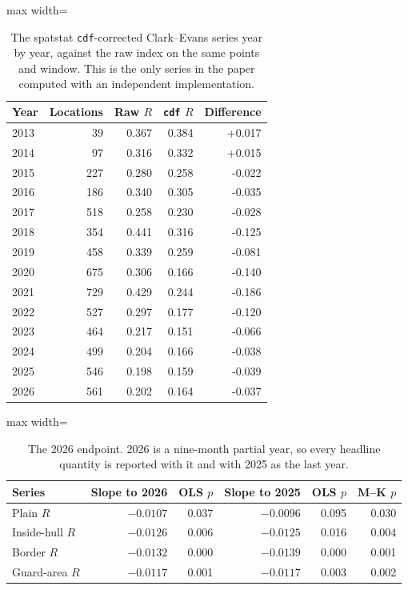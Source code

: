 \documentclass[fleqn,10pt]{wlpeerj}
\begin{document}
\begin{table}[H]
\centering
\caption{The \textsf{spatstat} \texttt{cdf}-corrected Clark--Evans series year by year, against
the raw index on the same points and window. This is the only series in the paper computed with
an independent implementation.}
\label{si:cdfseries}
\small
\begin{adjustbox}{max width=\linewidth}
\begin{tabular}{lrrrr}
\toprule
Year & Locations & Raw $R$ & \texttt{cdf} $R$ & Difference \\
\midrule
2013 & 39 & 0.367 & 0.384 & +0.017 \\
2014 & 97 & 0.316 & 0.332 & +0.015 \\
2015 & 227 & 0.280 & 0.258 & -0.022 \\
2016 & 186 & 0.340 & 0.305 & -0.035 \\
2017 & 518 & 0.258 & 0.230 & -0.028 \\
2018 & 354 & 0.441 & 0.316 & -0.125 \\
2019 & 458 & 0.339 & 0.259 & -0.081 \\
2020 & 675 & 0.306 & 0.166 & -0.140 \\
2021 & 729 & 0.429 & 0.244 & -0.186 \\
2022 & 527 & 0.297 & 0.177 & -0.120 \\
2023 & 464 & 0.217 & 0.151 & -0.066 \\
2024 & 499 & 0.204 & 0.166 & -0.038 \\
2025 & 546 & 0.198 & 0.159 & -0.039 \\
2026 & 561 & 0.202 & 0.164 & -0.037 \\
\bottomrule
\end{tabular}
\end{adjustbox}
\end{table}

\begin{table}[H]
\centering
\caption{The 2026 endpoint. 2026 is a nine-month partial year, so every headline quantity is
reported with it and with 2025 as the last year.}
\label{si:endpoint}
\small
\begin{adjustbox}{max width=\linewidth}
\begin{tabular}{lrrrrr}
\toprule
Series & Slope to 2026 & OLS $p$ & Slope to 2025 & OLS $p$ & M--K $p$ \\
\midrule
Plain $R$ & $-0.0107$ & 0.037 & $-0.0096$ & 0.095 & 0.030 \\
Inside-hull $R$ & $-0.0126$ & 0.006 & $-0.0125$ & 0.016 & 0.004 \\
Border $R$ & $-0.0132$ & 0.000 & $-0.0139$ & 0.000 & 0.001 \\
Guard-area $R$ & $-0.0117$ & 0.001 & $-0.0117$ & 0.003 & 0.002 \\
\bottomrule
\end{tabular}
\end{adjustbox}
\end{table}
\end{document}

